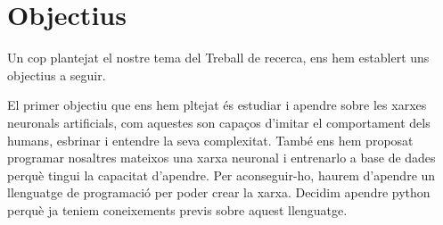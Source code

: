 \chapter{Objectius}
\label{c:objectius}
Un cop plantejat el nostre tema del Treball de recerca, ens hem establert uns objectius a seguir.

El primer objectiu que ens hem pltejat és estudiar i apendre sobre les xarxes neuronals artificials, com aquestes son capaços d'imitar el comportament dels humans, esbrinar i entendre la seva complexitat.
També ens hem proposat programar nosaltres mateixos una xarxa neuronal i entrenarlo a base de dades perquè tingui la capacitat d'apendre.
Per aconseguir-ho, haurem d'apendre un llenguatge de programació per poder crear la xarxa. Decidim apendre python perquè ja teniem coneixements previs sobre aquest llenguatge.
